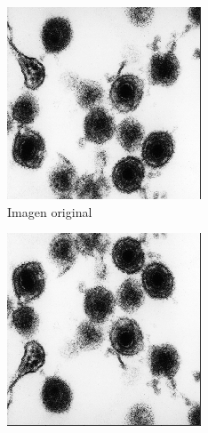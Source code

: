 \documentclass{uc3mpracticas}
\begin{document}
  \begin{figure}[!h]
    \centering
    \begin{subfigure}[b]{0.23\textwidth}
      \includegraphics[width=\textwidth, frame]{Images/og.png}
      \caption{Imagen original}
    \end{subfigure}
    \hfill
    \begin{subfigure}[b]{0.23\textwidth}
      \includegraphics[width=\textwidth, frame]{Images/voltArrAbj.png}

\end{subfigure}
\end{figure}
\end{document}

